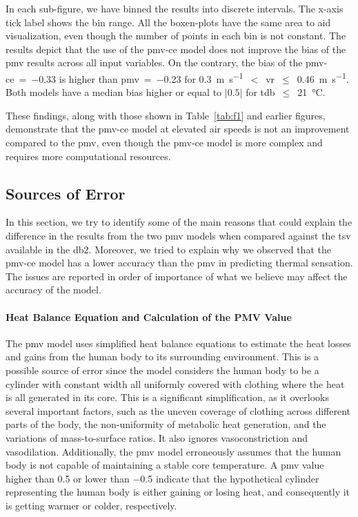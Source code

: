 In each sub-figure, we have binned the results into discrete intervals.
The x-axis tick label shows the bin range.
All the boxen-plots have the same area to aid visualization, even though the number of points in each bin is not constant.
The results depict that the use of the \ac{pmv-ce} model does not improve the bias of the \ac{pmv} results across all input variables.
On the contrary, the bias of the \ac{pmv-ce}~=~\num{-.33} is higher than \ac{pmv}~=~\num{-0.23} for \qty{0.3}{\m\per\s}~$<$~\ac{vr}~$\leq$~\qty{0.46}{\m\per\s}.
Both models have a median bias higher or equal to $\lvert0.5\lvert$ for \ac{tdb}~$\leq$~\qty{21}{\celsius}.

These findings, along with those shown in Table~\ref{tab:f1} and earlier figures, demonstrate that the \ac{pmv-ce} model at elevated air speeds is not an improvement compared to the \ac{pmv}, even though the \ac{pmv-ce} model is more complex and requires more computational resources.

\subsection{Sources of Error}\label{subsec:sources-of-error}
In this section, we try to identify some of the main reasons that could explain the difference in the results from the two \ac{pmv} models when compared against the \ac{tsv} available in the \ac{db2}.
Moreover, we tried to explain why we observed that the \ac{pmv-ce} model has a lower accuracy than the \ac{pmv} in predicting thermal sensation.
The issues are reported in order of importance of what we believe may affect the accuracy of the model.

\paragraph{Heat Balance Equation and Calculation of the PMV Value}
The \ac{pmv} model uses simplified heat balance equations to estimate the heat losses and gains from the human body to its surrounding environment.
This is a possible source of error since the model considers the human body to be a cylinder with constant width all uniformly covered with clothing where the heat is all generated in its core.
This is a significant simplification, as it overlooks several important factors, such as the uneven coverage of clothing across different parts of the body, the non-uniformity of metabolic heat generation, and the variations of mass-to-surface ratios.
It also ignores vasoconstriction and vasodilation.
Additionally, the \ac{pmv} model erroneously assumes that the human body is not capable of maintaining a stable core temperature.
A \ac{pmv} value higher than \num{.5} or lower than \num{-.5} indicate that the hypothetical cylinder representing the human body is either gaining or losing heat, and consequently it is getting warmer or colder, respectively.

